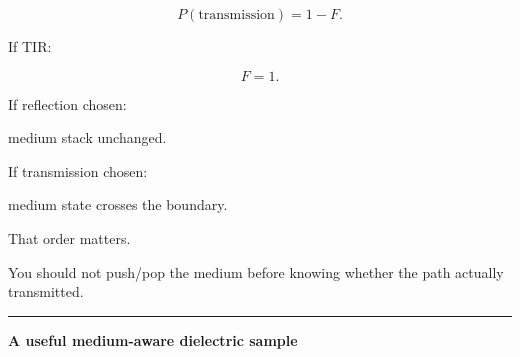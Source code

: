 \[
P(\text{transmission})=1-F.
\]

If TIR:

\[
F=1.
\]

If reflection chosen:

medium stack unchanged.

If transmission chosen:

medium state crosses the boundary.

That order matters.

You should not push/pop the medium before knowing whether the path actually transmitted.

\begin{center}\rule{0.5\linewidth}{0.5pt}\end{center}

\textbf{A useful medium-aware dielectric sample}

